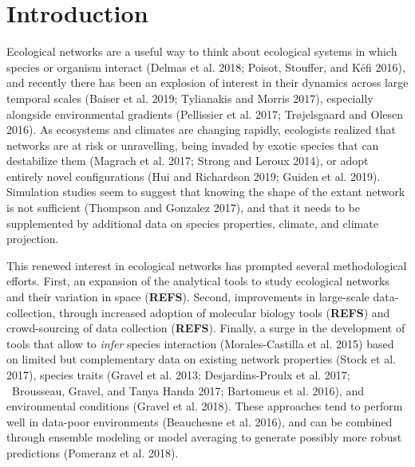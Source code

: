 \newcommand{\plusnamesingular}{}
\newcommand{\starnamesingular}{}
\newcommand{\xrefname}[1]{\protect\renewcommand{\plusnamesingular}{#1}}
\newcommand{\Xrefname}[1]{\protect\renewcommand{\starnamesingular}{#1}}
\providecommand{\cref}{\plusnamesingular~\ref}
\providecommand{\Cref}{\starnamesingular~\ref}
\providecommand{\crefformat}[2]{}
\providecommand{\Crefformat}[2]{}

\crefformat{figure}{fig.~#2#1#3}
\Crefformat{figure}{Figure~#2#1#3}

\hypertarget{introduction}{%
\section{Introduction}\label{introduction}}

Ecological networks are a useful way to think about ecological systems
in which species or organism interact (Delmas et al. 2018; Poisot,
Stouffer, and Kéfi 2016), and recently there has been an explosion of
interest in their dynamics across large temporal scales (Baiser et al.
2019; Tylianakis and Morris 2017), especially alongside environmental
gradients (Pellissier et al. 2017; Trøjelsgaard and Olesen 2016). As
ecosystems and climates are changing rapidly, ecologists realized that
networks are at risk or unravelling, being invaded by exotic species
that can destabilize them (Magrach et al. 2017; Strong and Leroux 2014),
or adopt entirely novel configurations (Hui and Richardson 2019; Guiden
et al. 2019). Simulation studies seem to suggest that knowing the shape
of the extant network is not sufficient (Thompson and Gonzalez 2017),
and that it needs to be supplemented by additional data on species
properties, climate, and climate projection.

This renewed interest in ecological networks has prompted several
methodological efforts. First, an expansion of the analytical tools to
study ecological networks and their variation in space (\textbf{REFS}).
Second, improvements in large-scale data-collection, through increased
adoption of molecular biology tools (\textbf{REFS}) and crowd-sourcing
of data collection (\textbf{REFS}). Finally, a surge in the development
of tools that allow to \emph{infer} species interaction
(Morales-Castilla et al. 2015) based on limited but complementary data
on existing network properties (Stock et al. 2017), species traits
(Gravel et al. 2013; Desjardins-Proulx et al. 2017; ~Brousseau, Gravel,
and Tanya Handa 2017; Bartomeus et al. 2016), and environmental
conditions (Gravel et al. 2018). These approaches tend to perform well
in data-poor environments (Beauchesne et al. 2016), and can be combined
through ensemble modeling or model averaging to generate possibly more
robust predictions (Pomeranz et al. 2018).

